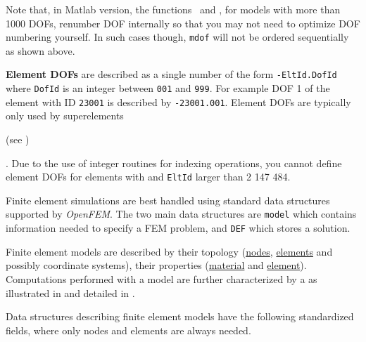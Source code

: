 Note that, in Matlab version, the functions \feeig\ and \femk, for models with more than 1000 DOFs, renumber DOF internally so that you may not need to optimize DOF numbering yourself. In such cases though, {\tt mdof} will not be ordered sequentially as shown above.


{\bf Element DOFs} are described as a single number of the form {\tt -EltId.DofId} where {\tt DofId} is an integer between {\tt 001} and {\tt 999}.  For example DOF 1 of the element with ID {\tt 23001} is described by {\tt -23001.001}.
Element DOFs are typically only used by superelements \begin{SDT}(see )\end{SDT}. Due to the use of integer routines for indexing operations, you cannot define element DOFs for elements with and {\tt EltId} larger than 2 147 484.


Finite element simulations are best handled using standard data structures supported by {\sl OpenFEM}. The two main data structures are {\tt model} which contains information needed to specify a FEM problem, and {\tt DEF} which stores a solution. 

Finite element models are described by their topology (\hyperlink{node}{nodes}, \hyperlink{elt}{elements} and possibly coordinate systems), their properties (\hyperlink{pl}{material} and \hyperlink{il}{element}). Computations performed with a model are further characterized by a  as illustrated in  and detailed in .

Data structures describing finite element models have the following standardized fields, where only nodes and elements are always needed.

